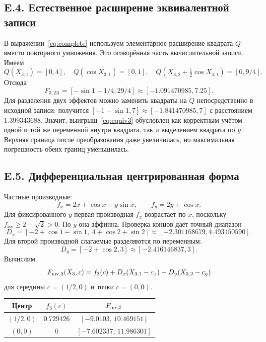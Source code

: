 \documentclass[12pt,a4paper]{article}
\begin{document}
\subsection*{E.4. Естественное расширение эквивалентной записи}
В выражении~\eqref{eq:complete} используем элементарное расширение
квадрата $Q$ вместо повторного умножения. Это оговорённая часть
вычислительной записи. Имеем
\[
Q(X_{3,1})=[0,4],\quad Q(\cos X_{3,1})=[0,1],
\quad Q\left(X_{3,2}+\tfrac12\cos X_{3,1}\right)=[0,9/4].
\]
Отсюда
\begin{equation}\label{eq:equiv3}
F_{3,E4}=[-\sin1-1/4,29/4]
\approx[-1.091470985,7.25].
\end{equation}
Для разделения двух эффектов можно заменить квадраты на $Q$
непосредственно в исходной записи: получится
$[-1-\sin1,7]\approx[-1.841470985,7]$ с расстоянием $1.399343688$.
Значит, выигрыш~\eqref{eq:equiv3} обусловлен как корректным учётом
одной и той же переменной внутри квадрата, так и выделением квадрата
по $y$. Верхняя граница после преобразования даже увеличилась,
но максимальная погрешность обеих границ уменьшилась.

\subsection*{E.5. Дифференциальная центрированная форма}
Частные производные:
\[
f_x=2x+\cos x-y\sin x,\qquad f_y=2y+\cos x.
\]
Для фиксированного $y$ первая производная $f_x$ возрастает по $x$,
поскольку $f_{xx}\geq2-\sqrt2>0$. По $y$ она аффинна.
Проверка концов даёт точный диапазон
\[
D_x=[-2+\cos1-\sin1,\ 4+\cos2+\sin2]
\approx[-2.301168679,4.493150590].
\]
Для второй производной слагаемые разделяются по переменным:
\[
D_y=[-2+\cos2,3]\approx[-2.416146837,3].
\]
Вычислим
\begin{equation}\label{eq:mv3}
F_{{\rm mv},3}(X_3,c)=f_3(c)+D_x(X_{3,1}-c_x)+D_y(X_{3,2}-c_y)
\end{equation}
для середины $c=(1/2,0)$ и точки $c=(0,0)$.

\begin{center}
{\small
\begin{tabular}{ccc}
\toprule
Центр & $f_3(c)$ & $F_{{\rm mv},3}$\\\midrule
$(1/2,0)$ & $0.729426$ & $[-9.0103,\,10.469151]$\\
$(0,0)$ & $0$ & $[-7.602337,\,11.986301]$\\
\bottomrule
\end{tabular}}
\end{center}
\end{document}
